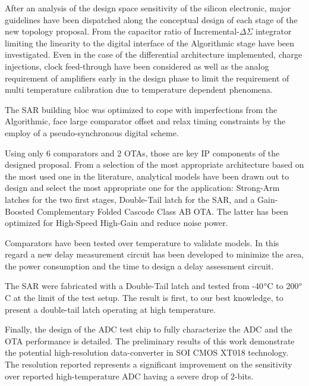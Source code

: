 After an analysis of the design space sensitivity of the silicon electronic, major guidelines have been dispatched along the conceptual design of each stage of the new topology proposal. From the capacitor ratio of Incremental-\(\Delta \Sigma\) integrator limiting the linearity to the digital interface of the Algorithmic stage have been investigated. Even in the case of the differential architecture implemented, charge injections, clock feed-through have been considered as well as the analog requirement of amplifiers early in the design phase to limit the requirement of multi temperature calibration due to temperature dependent phenomena.

The SAR building bloc was optimized to cope with imperfections from the Algorithmic, face large comparator offset and relax timing constraints by the employ of a pseudo-synchronous digital scheme.

Using only 6 comparators and 2 OTAs, those are key IP components of the designed proposal. From a selection of the most appropriate architecture based on the most used one in the literature, analytical models have been drawn out to design and select the most appropriate one for the application: Strong-Arm latches for the two first stages, Double-Tail latch for the SAR, and a Gain-Boosted Complementary Folded Cascode Class AB OTA\@. The latter has been optimized for High-Speed High-Gain and reduce noise power.

Comparators have been tested over temperature to validate models. In this regard a new delay measurement circuit has been developed to minimize the area, the power consumption and the time to design a delay assessment circuit.

The SAR were fabricated with a Double-Tail latch and tested from -40$\degree$C to 200$\degree$C at the limit of the test setup. The result is first, to our best knowledge, to present a double-tail latch operating at high temperature.

Finally, the design of the ADC test chip to fully characterize the ADC and the OTA performance is detailed. The preliminary results of this work demonstrate the potential high-resolution data-converter in SOI CMOS XT018 technology. The resolution reported represents a significant improvement on the sensitivity over reported high-temperature ADC having a severe drop of 2-bits.

